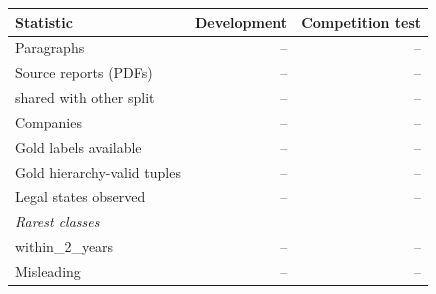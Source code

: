 \begin{tabular}{lrr}
\toprule
Statistic & Development & Competition test \\
\midrule
Paragraphs & -- & -- \\
Source reports (PDFs) & -- & -- \\
\quad shared with other split & -- & -- \\
Companies & -- & -- \\
Gold labels available & -- & -- \\
Gold hierarchy-valid tuples & -- & -- \\
Legal states observed & -- & -- \\
\midrule
\multicolumn{3}{l}{\emph{Rarest classes}} \\
\quad within\_2\_years & -- & -- \\
\quad Misleading & -- & -- \\
\bottomrule
\end{tabular}
